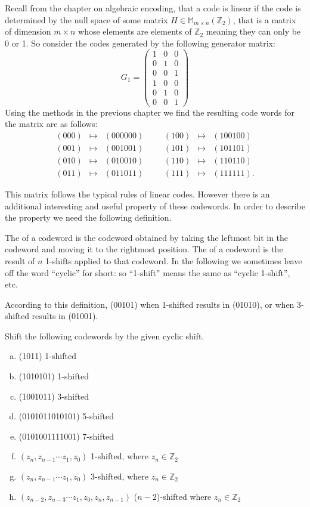   Recall from the chapter on algebraic encoding, that a code is linear if the code is determined by the null space of some matrix $H \in \mathbb{M}_{m\times n}(\mathbb{Z}_2)$, that is a matrix of dimension $m \times n$ whose elements are elements of $\mathbb{Z}_2$ meaning they can only be 0 or 1.  So consider the codes generated by the following generator matrix:
\[
G_1 
= 
\begin{pmatrix}
1 & 0 & 0 \\
0 & 1 & 0 \\
0 & 0 & 1 \\
1 & 0 & 0 \\
0 & 1 & 0 \\
0 & 0 & 1 
\end{pmatrix}
\]
Using the methods in the previous chapter we find the resulting code words for the matrix are as follows:
\[
\begin{array}{rclccrcl}
(000) & \mapsto & (000000) & & & (100) & \mapsto & (100100) \\
(001) & \mapsto & (001001) & & & (101) & \mapsto & (101101) \\
(010) & \mapsto & (010010) & & & (110) & \mapsto & (110110) \\
(011) & \mapsto & (011011) & & & (111) & \mapsto & (111111).
\end{array}
\]

This matrix follows the typical rules of linear codes. However there is an additional interesting and useful property of these codewords.  In order to describe the property we need the following definition.

\begin{defn}{}
The   of a codeword is the codeword obtained by taking the leftmost bit in the codeword and moving it to the rightmost position. The   of a codeword is the result of $n$ 1-shifts applied to that codeword. In the following we sometimes leave off the word ``cyclic'' for short: so ``1-shift'' means the same as ``cyclic 1-shift'', etc.
\end {defn}
According to this definition, (00101) when 1-shifted results in (01010), or when 3-shifted results in (01001).

\begin{exercise}{}
Shift the following codewords by the given cyclic shift.
\begin{enumerate}[a)]
\item (1011)  1-shifted
\item (1010101)  1-shifted
\item (1001011)  3-shifted
\item (0101011010101) 5-shifted
\item (0101001111001)  7-shifted
\item $(z_n, z_{n-1} \cdots z_1,z_0)$  1-shifted, where $z_n \in \mathbb{Z}_2$
\item $(z_n, z_{n-1} \cdots z_1,z_0)$  3-shifted, where $z_n \in \mathbb{Z}_2$
\item $(z_{n-2}, z_{n-3} \cdots z_1, z_0, z_{n},z_{n-1})$ ($n-2$)-shifted where $z_n \in \mathbb{Z}_2$
\end {enumerate}
\end {exercise}

